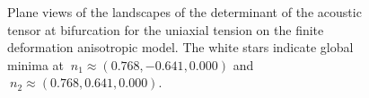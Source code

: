 \documentclass[12pt]{article}
\numberwithin{equation}{section}
\begin{document}
\begin{figure}[!htbp]
   \centering {}   
 \caption{Plane views of the landscapes of the determinant of the
   acoustic tensor at bifurcation for the uniaxial tension on the
   finite deformation anisotropic model. The white stars indicate
   global minima at $~n_1 \approx (0.768, -0.641, 0.000)$ and
   $~n_2 \approx (0.768, 0.641, 0.000)$.}
   \label{fig:aniso-uniaxial-detAXplane}
 \end{figure}
 
\end{document}
